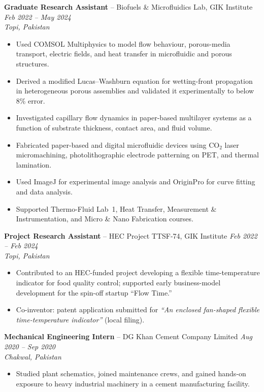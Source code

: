 \documentclass[11pt,a4paper]{article}
\begin{document}
\vspace{4pt}
\textbf{Graduate Research Assistant} -- Biofuels \& Microfluidics Lab, GIK
Institute \hfill \textit{Feb 2022 -- May 2024}\\
\textit{Topi, Pakistan}
\begin{itemize}
  \item Used COMSOL Multiphysics to model flow behaviour, porous-media transport,
        electric fields, and heat transfer in microfluidic and porous structures.
  \item Derived a modified Lucas--Washburn equation for wetting-front propagation
        in heterogeneous porous assemblies and validated it experimentally to
        below 8\% error.
  \item Investigated capillary flow dynamics in paper-based multilayer systems as
        a function of substrate thickness, contact area, and fluid volume.
  \item Fabricated paper-based and digital microfluidic devices using CO$_2$ laser
        micromachining, photolithographic electrode patterning on PET, and thermal
        lamination.
  \item Used ImageJ for experimental image analysis and OriginPro for curve
        fitting and data analysis.
  \item Supported Thermo-Fluid Lab~1, Heat Transfer, Measurement \&
        Instrumentation, and Micro \& Nano Fabrication courses.
\end{itemize}

\vspace{4pt}
\textbf{Project Research Assistant} -- HEC Project TTSF-74, GIK Institute
\hfill \textit{Feb 2022 -- Feb 2024}\\
\textit{Topi, Pakistan}
\begin{itemize}
  \item Contributed to an HEC-funded project developing a flexible
        time-temperature indicator for food quality control; supported early
        business-model development for the spin-off startup ``Flow Time.''
  \item Co-inventor: patent application submitted for \textit{``An enclosed
        fan-shaped flexible time-temperature indicator''} (local filing).
\end{itemize}

\vspace{4pt}
\textbf{Mechanical Engineering Intern} -- DG Khan Cement Company Limited
\hfill \textit{Aug 2020 -- Sep 2020}\\
\textit{Chakwal, Pakistan}
\begin{itemize}
  \item Studied plant schematics, joined maintenance crews, and gained hands-on
        exposure to heavy industrial machinery in a cement manufacturing facility.
\end{itemize}
\end{document}
